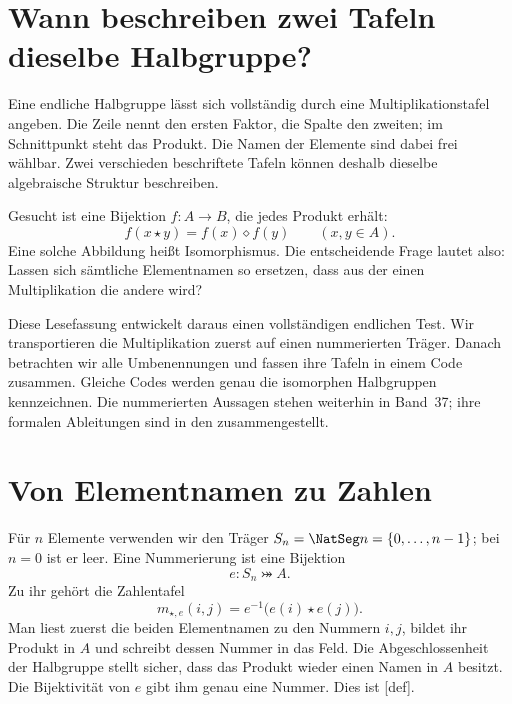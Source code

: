 \hypertarget{table-isomorphisms.reading}{}

\section*{Wann beschreiben zwei Tafeln dieselbe Halbgruppe?}

Eine endliche Halbgruppe lässt sich vollständig durch eine
Multiplikationstafel angeben. Die Zeile nennt den ersten Faktor, die
Spalte den zweiten; im Schnittpunkt steht das Produkt. Die Namen der
Elemente sind dabei frei wählbar. Zwei verschieden beschriftete Tafeln
können deshalb dieselbe algebraische Struktur beschreiben.

Gesucht ist eine Bijektion \(f\colon A\to B\), die jedes Produkt erhält:
\[
  f(x\star y)=f(x)\diamond f(y)\qquad(x,y\in A).
\]
Eine solche Abbildung heißt Isomorphismus. Die entscheidende Frage lautet
also: Lassen sich sämtliche Elementnamen so ersetzen, dass aus der einen
Multiplikation die andere wird?

Diese Lesefassung entwickelt daraus einen vollständigen endlichen Test.
Wir transportieren die Multiplikation zuerst auf einen nummerierten
Träger. Danach betrachten wir alle Umbenennungen und fassen ihre Tafeln
in einem Code zusammen. Gleiche Codes werden genau die isomorphen
Halbgruppen kennzeichnen. Die nummerierten Aussagen stehen weiterhin in
Band~37; ihre formalen Ableitungen sind in den
\TableIsomorphismsProofsLink{} zusammengestellt.

\section*{Von Elementnamen zu Zahlen}

Für \(n\) Elemente verwenden wir den Träger
\(S_n=\NatSeg n=\{0,\ldots,n-1\}\); bei \(n=0\) ist er leer.
Eine Nummerierung ist eine Bijektion
\[
  e\colon S_n\bij A.
\]
Zu ihr gehört die Zahlentafel
\[
  m_{\star,e}(i,j)=e^{-1}\bigl(e(i)\star e(j)\bigr).
\]
Man liest zuerst die beiden Elementnamen zu den Nummern \(i,j\),
bildet ihr Produkt in \(A\) und schreibt dessen Nummer in das Feld.
Die Abgeschlossenheit der Halbgruppe stellt sicher, dass das Produkt
wieder einen Namen in \(A\) besitzt. Die Bijektivität von \(e\) gibt
ihm genau eine Nummer. Dies ist
[def].

